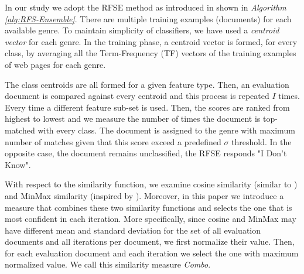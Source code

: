 \documentclass[runningheads]{llncs}
\begin{document}
%
%
%

In our study we adopt the RFSE method as introduced in \citep{pritsos2013open} shown in \textit{Algorithm \ref{alg:RFS-Ensemble}}. There are multiple training examples (documents) for each available genre. To maintain simplicity of classifiers, we have used a \textit{centroid vector} for each genre. In the training phase, a centroid vector is formed, for every class, by averaging all the Term-Frequency (TF) vectors of the training examples of web pages for each genre.

The class centroids are all formed for a given feature type. Then, an evaluation document is compared against every centroid and this process is repeated $I$ times. Every time a different feature sub-set is used. Then, the scores are ranked from highest to lowest and we measure the number of times the document is top-matched with every class. The document is assigned to the genre with maximum number of matches given that this score exceed a predefined $\sigma$ threshold. In the opposite case, the document remains unclassified, the RFSE responds "I Don't Know".


With respect to the similarity function, we examine cosine similarity (similar to \citep{pritsos2013open}) and MinMax similarity (inspired by \citep{koppel2014determining}). Moreover, in this paper we introduce a measure that combines these two similarity functions and selects the one that is most confident in each iteration. More specifically, since cosine and MinMax may have different mean and standard deviation for the set of all evaluation documents and all iterations per document, we first normalize their value. Then, for each evaluation document and each iteration we select the one with maximum normalized value. We call this similarity measure \textit{Combo}.
\end{document}
